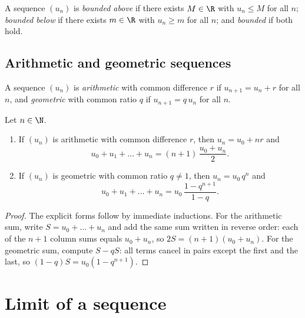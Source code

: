 \begin{definition}\label{def:tle:seq:bounded}
A sequence $(u_n)$ is \emph{bounded above} if there
exists $M \in \R$ with $u_n \leq M$ for all $n$; \emph{bounded below} if there
exists $m \in \R$ with $u_n \geq m$ for all $n$; and \emph{bounded} if both
hold.
\end{definition}

\subsection{Arithmetic and geometric sequences}

\begin{definition}\label{def:tle:seq:arith-geom}
A sequence $(u_n)$ is \emph{arithmetic} with common
difference $r$ if $u_{n+1} = u_n + r$ for all $n$, and
\emph{geometric} with common ratio $q$ if
$u_{n+1} = q\,u_n$ for all $n$.
\end{definition}

\begin{proposition}\label{prop:tle:seq:arith-geom}
Let $n \in \N$.
\begin{enumerate}
  \item If $(u_n)$ is arithmetic with common difference $r$, then
        $u_n = u_0 + nr$ and
        \[
        u_0 + u_1 + \dots + u_n = (n+1)\,\frac{u_0 + u_n}{2}.
        \]
  \item If $(u_n)$ is geometric with common ratio $q \neq 1$, then
        $u_n = u_0\, q^n$ and
        \[
        u_0 + u_1 + \dots + u_n = u_0\,\frac{1 - q^{n+1}}{1 - q}.
        \]
\end{enumerate}
\end{proposition}

\begin{proof}
The explicit forms follow by immediate inductions. For the arithmetic sum,
write $S = u_0 + \dots + u_n$ and add the same sum written in reverse order:
each of the $n+1$ column sums equals $u_0 + u_n$, so $2S = (n+1)(u_0+u_n)$.
For the geometric sum, compute $S - qS$: all terms cancel in pairs except the
first and the last, so $(1-q)S = u_0(1 - q^{n+1})$.
\end{proof}

\section{Limit of a sequence}

